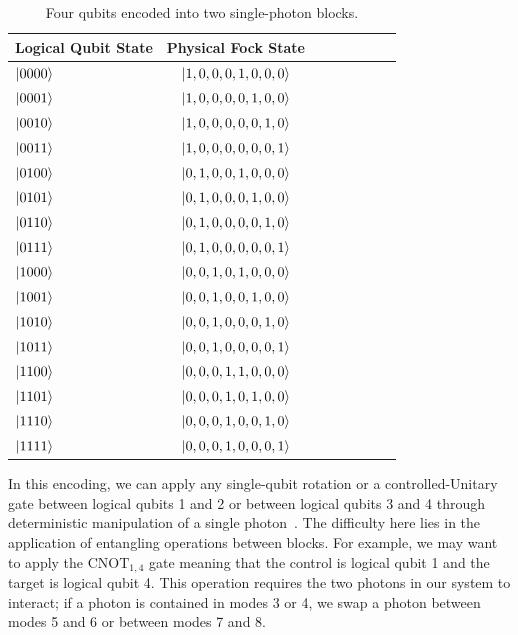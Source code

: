 \documentclass[aps,pra,twocolumn,superscriptaddress,floatfix,10pt]{revtex4}
\begin{document}
\begin {table}[h]
\begin{center}
	\begin{tabular}{l*{6}{c}r} 
		Logical Qubit State      \quad \quad \quad     & Physical Fock State \\
		\hline 
		\quad \quad \quad $\ket{0000}$     & $\ket{1,0,0,0,1,0,0,0}$ \\
		\quad \quad \quad $\ket{0001}$            & $\ket{1,0,0,0,0,1,0,0}$ \\
		\quad \quad \quad $\ket{0010}$           & 
		$\ket{1,0,0,0,0,0,1,0}$ \\
		\quad \quad \quad $\ket{0011}$           & 
		$\ket{1,0,0,0,0,0,0,1}$ \\
		\quad \quad \quad $\ket{0100}$           & 
		$\ket{0,1,0,0,1,0,0,0}$ \\
		\quad \quad \quad $\ket{0101}$           & 
		$\ket{0,1,0,0,0,1,0,0}$ \\
		\quad \quad \quad $\ket{0110}$           & 
		$\ket{0,1,0,0,0,0,1,0}$ \\
		\quad \quad \quad $\ket{0111}$            & $\ket{0,1,0,0,0,0,0,1}$ \\
		\quad \quad \quad $\ket{1000}$            & $\ket{0,0,1,0,1,0,0,0}$ \\
		\quad \quad \quad $\ket{1001}$            & $\ket{0,0,1,0,0,1,0,0}$ \\
		\quad \quad \quad $\ket{1010}$            & $\ket{0,0,1,0,0,0,1,0}$ \\
		\quad \quad \quad $\ket{1011}$            & $\ket{0,0,1,0,0,0,0,1}$ \\
		\quad \quad \quad $\ket{1100}$            & $\ket{0,0,0,1,1,0,0,0}$ \\
		\quad \quad \quad $\ket{1101}$            & $\ket{0,0,0,1,0,1,0,0}$ \\
		\quad \quad \quad $\ket{1110}$            & $\ket{0,0,0,1,0,0,1,0}$ \\
		\quad \quad \quad $\ket{1111}$            & $\ket{0,0,0,1,0,0,0,1}$ \\
	\end{tabular}
	\caption{ \label{Block Encoding Table} Four qubits encoded into two single-photon blocks.}
\end{center}
\end{table}
In this encoding, we can apply any single-qubit rotation or a controlled-Unitary gate between logical qubits 1 and 2 or between logical qubits 3 and 4 through deterministic manipulation of a single photon~\cite{Review Paper,Adami,Lanyon,Bao,Zadeh}. The difficulty here lies in the application of entangling operations between blocks. For example, we may want to apply the $\mbox{CNOT}_{1,4}$ gate meaning that the control is logical qubit 1 and the target is logical qubit 4. This operation requires the two photons in our system to interact; if a photon is contained in modes 3 or 4, we swap a photon between modes 5 and 6 or between modes 7 and 8. 
\end{document}
